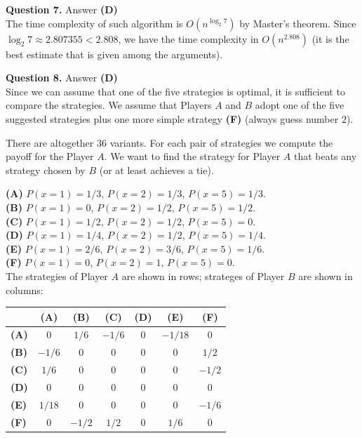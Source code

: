 \documentclass[jou]{apa6}
\begin{document}
\vspace{10pt}
{\bf Question 7.} Answer {\bf (D)}\\
The time complexity of such algorithm is $O(n^{\log_2 7})$ by Master's theorem. Since 
$\log_2 7 \approx 2.807355 < 2.808$, we have the time complexity in $O(n^{2.808})$ (it is the best estimate that is given 
among the arguments).


\vspace{10pt}
{\bf Question 8.} Answer {\bf (D)}\\
Since we can assume that one of the five strategies is optimal, it is sufficient to compare the strategies. 
We assume that Players $A$ and $B$ adopt one of the five suggested strategies
plus one more simple strategy {\bf (F)} (always guess number $2$). 

There are altogether $36$ variants. 
For each pair of strategies we compute the payoff for the Player $A$. 
We want to find the strategy for Player $A$ 
that beats any strategy chosen by $B$ (or at least achieves a tie). 

{\bf (A)} $P(x = 1) = 1/3$, $P(x = 2) = 1/3$, $P(x = 5) = 1/3$.\\
{\bf (B)} $P(x = 1) = 0$, $P(x = 2) = 1/2$, $P(x = 5) = 1/2$.\\
{\bf (C)} $P(x = 1) = 1/2$, $P(x = 2) = 1/2$, $P(x = 5) = 0$.\\
{\bf (D)} $P(x = 1) = 1/4$, $P(x = 2) = 1/2$, $P(x = 5) = 1/4$.\\
{\bf (E)} $P(x = 1) = 2/6$, $P(x = 2) = 3/6$, $P(x = 5) = 1/6$.\\
{\bf (F)} $P(x = 1) = 0$, $P(x = 2) = 1$, $P(x = 5) = 0$.\\

The strategies of Player $A$ are shown in rows; strateges of Player $B$ are shown in columns: 

\begin{tabular}{|l|c|c|c|c|c|c|} \hline
 & {\bf (A)} & {\bf (B)} & {\bf (C)} & {\bf (D)} & {\bf (E)} & {\bf (F)} \\ \hline
{\bf (A)} & $0$ & $1/6$ & $-1/6$ & $0$ & $-1/18$ & $0$ \\ \hline
{\bf (B)} & $-1/6$ & $0$ & $0$ & $0$ & $0$ & $1/2$ \\ \hline
{\bf (C)} & $1/6$ & $0$ & $0$ & $0$ & $0$ & $-1/2$ \\ \hline
{\bf (D)} & $0$ & $0$ & $0$ & $0$ & $0$ & $0$ \\ \hline
{\bf (E)} & $1/18$ & $0$ & $0$ & $0$ & $0$ & $-1/6$ \\ \hline
{\bf (F)} & $0$ & $-1/2$ & $1/2$ & $0$ & $1/6$ & $0$ \\ \hline
\end{tabular}
\end{document}
